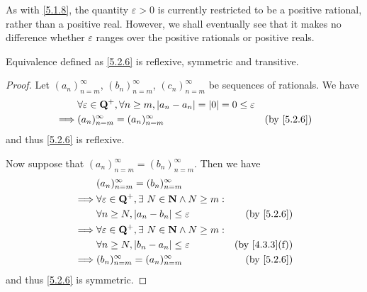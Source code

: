 \begin{remark}\label{5.2.7}
  As with \cref{5.1.8}, the quantity \(\varepsilon > 0\) is currently restricted to be a positive rational, rather than a positive real.
  However, we shall eventually see that it makes no difference whether \(\varepsilon\) ranges over the positive rationals or positive reals.
\end{remark}

\begin{additional corollary}\label{ac 5.2.1}
Equivalence defined as \cref{5.2.6} is reflexive, symmetric and transitive.
\end{additional corollary}

\begin{proof}
  Let \((a_n)_{n = m}^\infty\), \((b_n)_{n = m}^\infty\), \((c_n)_{n = m}^\infty\) be sequences of rationals.
  We have
  \begin{align*}
             & \forall \varepsilon \in \Q^+, \forall n \geq m, \abs{a_n - a_n} = \abs{0} = 0 \leq \varepsilon                            \\
    \implies & (a_n)_{n = m}^\infty = (a_n)_{n = m}^\infty                                                    & \text{(by \cref{5.2.6})}
  \end{align*}
  and thus \cref{5.2.6} is reflexive.

  Now suppose that \((a_n)_{n = m}^\infty = (b_n)_{n = m}^\infty\).
  Then we have
  \begin{align*}
             & (a_n)_{n = m}^\infty = (b_n)_{n = m}^\infty                                                   \\
    \implies & \forall \varepsilon \in \Q^+, \exists\ N \in \N \land N \geq m:                               \\
             & \forall n \geq N, \abs{a_n - b_n} \leq \varepsilon              & \text{(by \cref{5.2.6})}    \\
    \implies & \forall \varepsilon \in \Q^+, \exists\ N \in \N \land N \geq m:                               \\
             & \forall n \geq N, \abs{b_n - a_n} \leq \varepsilon              & \text{(by \cref{4.3.3}(f))} \\
    \implies & (b_n)_{n = m}^\infty = (a_n)_{n = m}^\infty                     & \text{(by \cref{5.2.6})}
  \end{align*}
  and thus \cref{5.2.6} is symmetric.


\end{proof}
